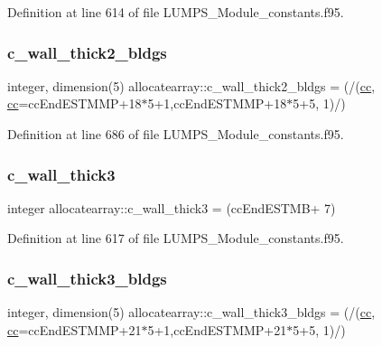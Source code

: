 Definition at line 614 of file L\+U\+M\+P\+S\+\_\+\+Module\+\_\+constants.\+f95.

\mbox{\label{namespaceallocatearray_afa52a2b3030dd70bca77ed4c1a0d4717}} 
\subsubsection{\texorpdfstring{c\+\_\+wall\+\_\+thick2\+\_\+bldgs}{c\_wall\_thick2\_bldgs}}
{\footnotesize\ttfamily integer, dimension(5) allocatearray\+::c\+\_\+wall\+\_\+thick2\+\_\+bldgs = (/(\hyperlink{namespaceallocatearray_ac863c81704eb507dee10f5e10741e10c}{cc}, \hyperlink{namespaceallocatearray_ac863c81704eb507dee10f5e10741e10c}{cc}=cc\+End\+E\+S\+T\+M\+MP+18$\ast$5+1,cc\+End\+E\+S\+T\+M\+MP+18$\ast$5+5, 1)/)}



Definition at line 686 of file L\+U\+M\+P\+S\+\_\+\+Module\+\_\+constants.\+f95.

\mbox{\label{namespaceallocatearray_ad6febb7b97a4695b1b6e64af1d01b39d}} 
\subsubsection{\texorpdfstring{c\+\_\+wall\+\_\+thick3}{c\_wall\_thick3}}
{\footnotesize\ttfamily integer allocatearray\+::c\+\_\+wall\+\_\+thick3 = (cc\+End\+E\+S\+T\+MB+ 7)}



Definition at line 617 of file L\+U\+M\+P\+S\+\_\+\+Module\+\_\+constants.\+f95.

\mbox{\label{namespaceallocatearray_afeb16544bc15664add2e4c9c69fff38a}} 
\subsubsection{\texorpdfstring{c\+\_\+wall\+\_\+thick3\+\_\+bldgs}{c\_wall\_thick3\_bldgs}}
{\footnotesize\ttfamily integer, dimension(5) allocatearray\+::c\+\_\+wall\+\_\+thick3\+\_\+bldgs = (/(\hyperlink{namespaceallocatearray_ac863c81704eb507dee10f5e10741e10c}{cc}, \hyperlink{namespaceallocatearray_ac863c81704eb507dee10f5e10741e10c}{cc}=cc\+End\+E\+S\+T\+M\+MP+21$\ast$5+1,cc\+End\+E\+S\+T\+M\+MP+21$\ast$5+5, 1)/)}



